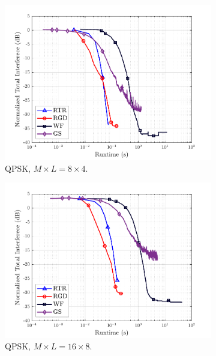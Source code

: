 \begin{figure}[ht]
	\centering
	\begin{subfigure}{0.48\linewidth}
		\centering
		\includegraphics[width=0.95\linewidth]{./figs/rocma_figs/ROCMA_MSR_TI_QgSt_runtime_4QAM_L=4_M=8_J=4_nSim_100.pdf}
		\caption{QPSK, $M\times L = 8\times4$.}\label{rocma:fig:CMA_ROCMA_runtime_8x4_4qam}
	\end{subfigure}
	\begin{subfigure}{0.48\linewidth}
		\centering
		\includegraphics[width=0.95\linewidth]{./figs/rocma_figs/ROCMA_MSR_TI_QgSt_runtime_4QAM_L=8_M=16_J=8_nSim_100.pdf}
		\caption{QPSK, $M\times L = 16\times8$.}\label{rocma:fig:CMA_ROCMA_runtime_16x8_4qam}		
	\end{subfigure}
	\begin{subfigure}{0.48\linewidth}

\end{subfigure}
\end{figure}
